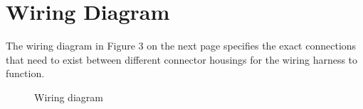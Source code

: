 \documentclass[12pt,letterpaper]{article}
\begin{document}


\section{Wiring Diagram}
The wiring diagram in Figure 3 on the next page specifies the exact connections that need to exist between different connector housings for the wiring harness to function.

\nopagebreak 
\begin{figure}[h]\label{fig:wiring}
\centering
\def\svgwidth{\columnwidth}

\caption{Wiring diagram}
\end{figure}
\clearpage
\end{document}

